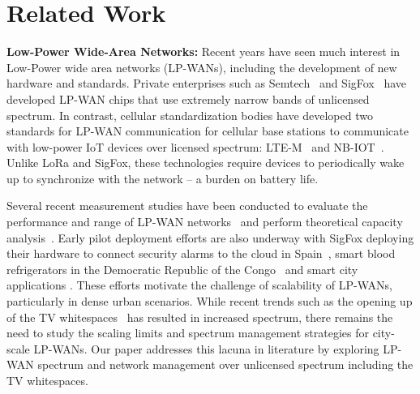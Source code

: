 \section{Related Work}
\label{sec:related-work}




\noindent \textbf{Low-Power Wide-Area Networks: } Recent years have seen much interest in Low-Power wide area networks (LP-WANs), including the development of new hardware and standards. Private enterprises such as Semtech~\cite{Sornin2015, LoRaWanAlliance2015} and SigFox~\cite{sanchez2016state} have developed LP-WAN chips that use extremely narrow bands of unlicensed spectrum. In contrast, cellular standardization bodies have developed two standards for LP-WAN communication  for cellular base stations to communicate with low-power IoT devices over licensed spectrum:  LTE-M~\cite{GSMAssociation2016} and NB-IOT~\cite{Ratasuk2016}. Unlike LoRa and SigFox, these technologies require devices to periodically wake up to synchronize with the network -- a burden on battery life.

Several recent measurement studies have been conducted to evaluate the performance and range of LP-WAN networks~\cite{petric2016measurements, 7499263, toldov2016performance} and perform theoretical capacity analysis~\cite{mikhaylov2016analysis}. Early pilot deployment efforts are also underway with
SigFox deploying their hardware to connect security alarms to the cloud in Spain~\cite{sanchez2016state}, smart blood refrigerators in the Democratic Republic of the Congo~\cite{ramachandranmupnp} and smart city applications \cite{centenaro2015long}. These efforts motivate the challenge of scalability of LP-WANs, particularly in dense urban scenarios. While recent trends such as the opening up of the TV whitespaces~\cite{FCC_Whitespaces} has resulted in increased spectrum, there remains the need to study the scaling limits and spectrum management strategies for city-scale LP-WANs. Our paper addresses this lacuna in literature by exploring LP-WAN spectrum and network management over unlicensed spectrum including the TV whitespaces. \\\vspace*{-0.1in}


